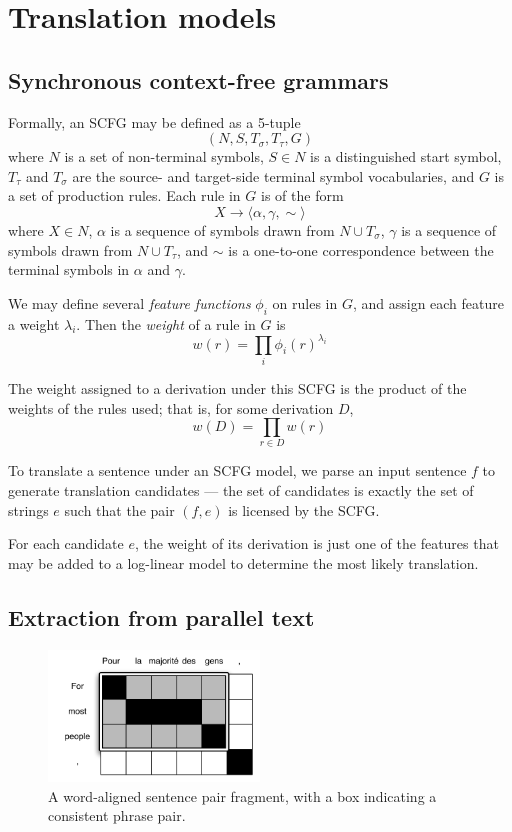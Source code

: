 \documentclass{article}
\begin{document}
\section{Translation models}

\subsection{Synchronous context-free grammars}

Formally, an SCFG may be defined as a 5-tuple
$$(N,S,T_\sigma,T_\tau,G)$$
where $N$ is a set of non-terminal symbols, $S \in N$ is a distinguished start symbol, $T_\tau$ and $T_\sigma$ are the source- and target-side terminal symbol vocabularies, and $G$ is a set of production rules. Each rule in $G$ is of the form
$$X \to \langle \alpha, \gamma, \sim \rangle$$
where $X \in N$, $\alpha$ is a sequence of symbols drawn from $N \cup T_\sigma$, $\gamma$ is a sequence of symbols drawn from $N \cup T_\tau$, and $\sim$ is a one-to-one correspondence between the terminal symbols in $\alpha$ and $\gamma$.

We may define several {\em feature functions} $\phi_i$ on rules in $G$, and assign each feature a weight $\lambda_i$. Then the {\em weight} of a rule in $G$ is
\begin{equation}
w(r) = \prod_i{\phi_i(r)^{\lambda_i}}
\end{equation}

The weight assigned to a derivation under this SCFG is the product of the weights of the rules used; that is, for some derivation $D$,
\begin{equation}
w(D) = \prod_{r \in D}{w(r)}
\end{equation}

To translate a sentence under an SCFG model, we parse an input sentence $f$ to generate translation candidates --- the set of candidates is exactly the set of strings $e$ such that the pair $(f,e)$ is licensed by the SCFG.

For each candidate $e$, the weight of its derivation is just one of the features that may be added to a log-linear model to determine the most likely translation.

\subsection{Extraction from parallel text}

\begin{figure}[t]
\includegraphics[width=0.5\textwidth]{../wmt11/figures/simple-rule}
\caption{A word-aligned sentence pair fragment, with a box indicating a consistent phrase pair.\label{fig:aligned-sentence}}
\end{figure}
\end{document}
